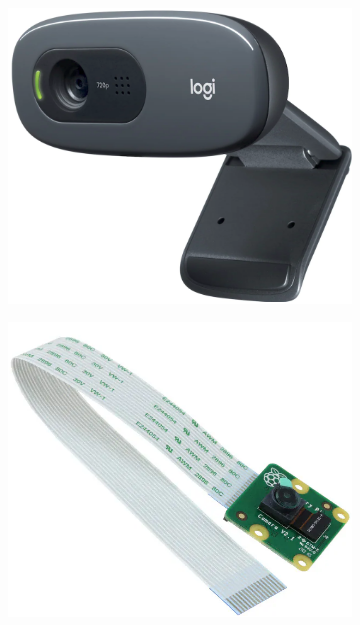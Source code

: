 \documentclass[../Head/report.tex]{subfiles}
\begin{document}
\begin{figure}[H]
\begin{subfigure}[b]{.07\textwidth}
         \vspace{1.0em}
        \caption{}
        \label{fig:tpLinkac}
    \end{subfigure}
     \hspace{-2.0em}
          \hspace{8.0em}
        \begin{subfigure}[b]{.17\textwidth}
        \centering
        \includegraphics[width=1\linewidth]{../Figures/raspberry_pi/c270_dh_webcam.png}
         \vspace{-1.8em}
        \caption{}
        \label{fig:raspberry_pi_front_cam}
    \end{subfigure}
         \hspace{2.5em}
        \begin{subfigure}[b]{.16\textwidth}
        \centering
        \includegraphics[width=1\linewidth]{../Figures/raspberry_pi/raspberry_pi_cam.png}

\end{subfigure}
\end{figure}
\end{document}
